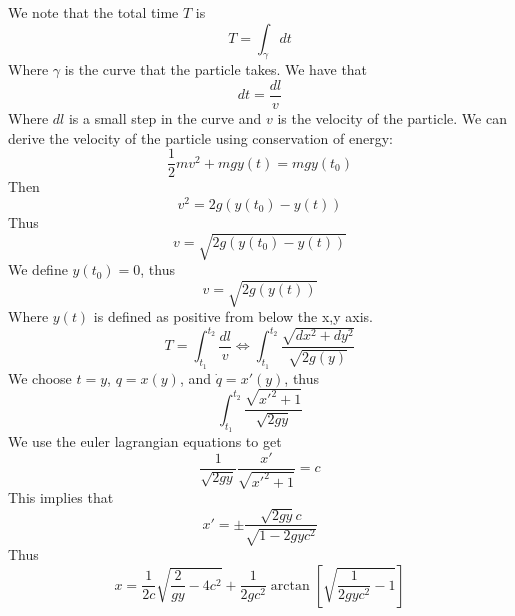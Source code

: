\documentclass{article}
\newtheorem{one minute paper}[theorem]{One Minute Paper}
\begin{document}
We note that the total time $T$ is 
\begin{equation}
    T = \int_{\gamma}dt
\end{equation}
Where $\gamma$ is the curve that the particle takes. We have that 
\begin{equation}
    dt = \frac{dl}{v}
\end{equation}
Where $dl$ is a small step in the curve and $v$ is the velocity of the particle. We can derive the velocity of the particle using conservation of energy:
\begin{equation}
    \frac{1}{2}mv^2 + mgy(t) = mgy(t_0)
\end{equation}
Then 
\begin{equation}
    v^2 = 2g(y(t_0) - y(t))
\end{equation}
Thus 
\begin{equation}
    v = \sqrt{2g(y(t_0) - y(t))}
\end{equation}
We define $y(t_0) = 0$, thus 
\begin{equation}
    v = \sqrt{2g(y(t))}
\end{equation}
Where $y(t)$ is defined as positive from below the x,y axis. 
\begin{equation}
    T = \int_{t_1}^{t_2}\frac{dl}{v} \iff \int_{t_1}^{t_2}\frac{\sqrt{dx^2 + dy^2}}{\sqrt{2g(y)}}
\end{equation}
We choose $t = y$, $q = x(y)$, and $\dot{q} = x'(y)$, thus 
\begin{equation}
    \int_{t_1}^{t_2}\frac{\sqrt{x'^2 + 1}}{\sqrt{2gy}}
\end{equation}
We use the euler lagrangian equations to get 
\begin{equation}
    \frac{1}{\sqrt{2gy}}\frac{x'}{\sqrt{x'^2+1}} = c
\end{equation}
This implies that 
\begin{equation}
    x' = \pm \frac{\sqrt{2gy}c}{\sqrt{1-2gyc^2}}
\end{equation}
Thus 
\begin{equation}
    x = \frac{1}{2c}\sqrt{\frac{2}{gy}-4c^2} + \frac{1}{2gc^2}\arctan\left[\sqrt{\frac{1}{2gyc^2} - 1}\right]
\end{equation}
\end{document}
